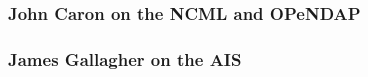 \subsubsection{John Caron on the \ac{NCML} and \ac{OPeNDAP}}

\subsubsection{James Gallagher on the \ac{AIS}}

%
%
%
